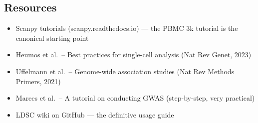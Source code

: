 \subsection{Resources}
\begin{itemize}[nosep]
  \item Scanpy tutorials (scanpy.readthedocs.io) --- the PBMC 3k tutorial is the canonical starting point
  \item Heumos et al.\ -- Best practices for single-cell analysis (Nat Rev Genet, 2023)
  \item Uffelmann et al.\ -- Genome-wide association studies (Nat Rev Methods Primers, 2021)
  \item Marees et al.\ -- A tutorial on conducting GWAS (step-by-step, very practical)
  \item LDSC wiki on GitHub --- the definitive usage guide
\end{itemize}
